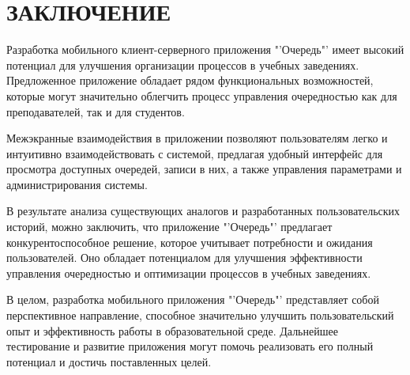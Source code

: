 \chapter*{ЗАКЛЮЧЕНИЕ}
Разработка мобильного клиент-серверного приложения "'Очередь"'
имеет высокий потенциал для улучшения организации процессов
в учебных заведениях.
Предложенное приложение обладает рядом функциональных возможностей,
которые могут значительно облегчить процесс управления очередностью
как для преподавателей, так и для студентов.\par
Межэкранные взаимодействия в приложении позволяют пользователям легко
и интуитивно взаимодействовать с системой, предлагая удобный интерфейс
для просмотра доступных очередей, записи в них,
а также управления параметрами и администрирования системы.\par
В результате анализа существующих аналогов и разработанных пользовательских
историй, можно заключить, что приложение "'Очередь"'
предлагает конкурентоспособное решение,
которое учитывает потребности и ожидания пользователей.
Оно обладает потенциалом для улучшения эффективности управления очередностью
и оптимизации процессов в учебных заведениях.\par
В целом, разработка мобильного приложения "'Очередь"'
представляет собой перспективное направление,
способное значительно улучшить пользовательский опыт
и эффективность работы в образовательной среде.
Дальнейшее тестирование и развитие приложения могут помочь реализовать
его полный потенциал и достичь поставленных целей.\par

\label{lastpage}

